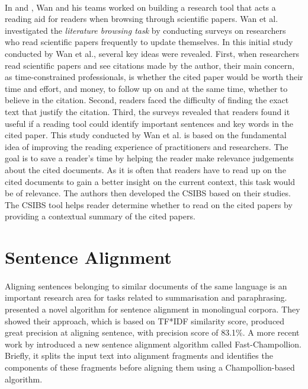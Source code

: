 \paragraph{}
In \cite{citation-sensitive} and \cite{csibs}, Wan and his teams worked on building a research tool that acts a reading aid for readers when browsing through scientific papers. Wan et al. investigated the \textit{literature browsing task} by conducting surveys on researchers who read scientific papers frequently to update themselves. In this initial study conducted by Wan et al., several key ideas were revealed. First, when researchers read scientific papers and see citations made by the author, their main concern, as time-constrained professionals, is whether the cited paper would be worth their time and effort, and money, to follow up on and at the same time, whether to believe in the citation. Second, readers faced the difficulty of finding the exact text that justify the citation. Third, the surveys revealed that readers found it useful if a reading tool could identify important sentences and key words in the cited paper. This study conducted by Wan et al. is based on the fundamental idea of improving the reading experience of practitioners and researchers. The goal is to save a reader's time by helping the reader make relevance judgements about the cited documents. As it is often that readers have to read up on the cited documents to gain a better insight on the current context, this task would be of relevance. The authors then developed the CSIBS based on their studies. The CSIBS tool helps reader determine whether to read on the cited papers by providing a contextual summary of the cited papers.

\section{Sentence Alignment}
\paragraph{}
Aligning sentences belonging to similar documents of the same language is an important research area for tasks related to summarisation and paraphrasing. \cite{nelken2006towards} presented a novel algorithm for sentence alignment in monolingual corpora. They showed their approach, which is based on TF*IDF similarity score, produced great precision at aligning sentence, with precision score of 83.1\%. A more recent work by \cite{li2010fast} introduced a new sentence alignment algorithm called Fast-Champollion. Briefly, it splits the input text into alignment fragments and identifies the components of these fragments before aligning them using a Champollion-based algorithm.




